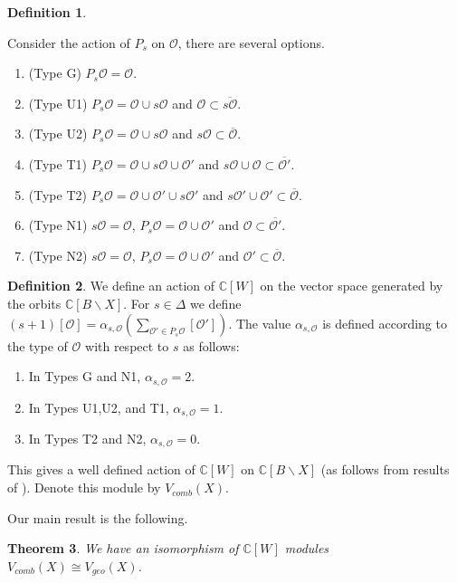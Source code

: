 \documentclass[12pt]{article}
\newcommand{\C}{\mathbb{C}}
\newcommand{\s}{\mathcal{O}}
\theoremstyle{plain}
\newtheorem{theorem}{Theorem}[section]
\theoremstyle{definition}
\newtheorem{defn}[theorem]{Definition}
\begin{document}
\begin{defn}\label{type_rank_1_spheric}

Consider the action of $P_s$ on $\s$, there are several options.

\begin{enumerate}
    \item (Type G) $P_s\s=\s$.
    \item (Type U1) $P_s\s=\s\cup s\s$ and $\s\subset \overline{s\s}$.
    \item (Type U2) $P_s\s=\s\cup s\s$ and $s\s\subset \overline{\s}$.
    \item (Type T1) $P_s\s=\s\cup s\s\cup \s'$ and $s\s\cup \s \subset \overline{\s'}$.
    \item (Type T2) $P_s\s=\s\cup \s'\cup s\s'$ and $s\s'\cup \s' \subset \overline{\s}$.
    \item (Type N1) $s\s=\s$, $P_s\s=\s\cup \s'$ and $ \s \subset \overline{\s'}$.
    \item (Type N2) $s\s=\s$, $P_s\s=\s\cup \s'$ and $\s' \subset \overline{\s}$.
\end{enumerate}
    
\end{defn}

\begin{defn}
    We define an action of $\C[W]$ on the vector space generated by the orbits $\C[B\backslash X]$. For $s\in \Delta$ we define $(s+1)[\s]=\alpha_{s,\s}(\sum_{\s'\in P_s\s}[\s'])$. The value $\alpha_{s,\s}$ is defined according to the type of $\s$ with respect to $s$ as follows: 

    \begin{enumerate}
    \item In Types G and N1, $\alpha_{s,\s}=2$.
    \item In Types U1,U2, and T1, $\alpha_{s,\s}=1$.
    \item In Types T2 and N2, $\alpha_{s,\s}=0$.
\end{enumerate}

This gives a well defined action of $\C[W]$ on $\C[B\backslash X]$ (as follows from results of \cite{knop}). Denote this module by $V_{comb}(X)$. 
\end{defn}

Our main result is the following.

\begin{theorem}\label{main}
    We have an isomorphism of $\C[W]$ modules $V_{comb}(X)\cong V_{geo}(X)$.
\end{theorem}
\end{document}
